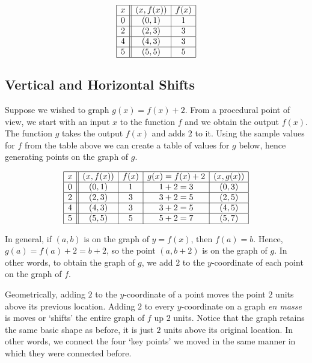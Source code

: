 \documentclass{ximera}
\begin{document}
\begin{center}
\[ \begin{array}{|c||c|c|}  

\hline

 x & (x,f(x)) & f(x)  \\ \hline
0  & (0,1)& 1  \\  \hline
2 & (2,3) & 3  \\  \hline
4 & (4,3) & 3  \\  \hline
5 & (5,5) & 5 \\  \hline

\end{array} \] 





\end{center}

\subsection{Vertical and Horizontal Shifts}
\label{shifts}

Suppose we wished to graph $g(x) = f(x) + 2$.  From a procedural point of view,  we start with an input $x$ to the function $f$ and we obtain the output $f(x)$.  The function $g$ takes the output $f(x)$ and adds $2$ to it.  Using the sample values for $f$ from the table above we can create a table of values for $g$ below, hence generating points on the graph of $g$.


\[ \begin{array}{|c||c|c|c|c|}  

\hline

 x & (x,f(x)) & f(x) & g(x)=f(x)+2 & (x, g(x)) \\ \hline
0  & (0,1)& 1 & 1+2 = 3 &(0, 3) \\  \hline
2 & (2,3) & 3 & 3 + 2 =  5 &(2,5) \\  \hline
4 & (4,3) & 3 & 3 + 2 =  5 &(4, 5) \\  \hline
5 & (5,5) & 5 & 5+2 =  7 &( 5 ,7) \\  \hline

\end{array} \] 

In general,  if $(a,b)$ is on the graph of $y=f(x)$, then $f(a) = b$. Hence, $g(a) = f(a) +2 = b+2$, so the point $(a,b+2)$ is on the graph of $g$. In other words, to obtain the graph of $g$, we add $2$ to the $y$-coordinate of each point on the graph of $f$.  

\smallskip

Geometrically, adding $2$ to the $y$-coordinate of a point moves the point $2$ units above its previous location.  Adding $2$ to every $y$-coordinate on a graph \textit{en masse} is moves or `shifts'  the entire graph of $f$  up $2$ units.  Notice that the graph retains the same basic shape as before, it is just $2$ units above its original location.  In other words, we connect the four `key points' we moved in the same manner in which they were connected before.  
\end{document}
